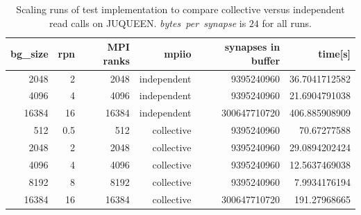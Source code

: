 \begin{table}[h!]
  \caption{Scaling runs of test implementation to compare collective versus independent read calls on JUQUEEN. \emph{bytes~per~synapse} is $24$ for all runs.}
\begin{center}
\begin{tabular}{|r|r|r|r|r|r|}
\hline
bg\_size& rpn & MPI ranks & mpiio & synapses in buffer & time[s] \\
\hline\hline
2048    &  2  & 2048      & independent  &  9395240960 & 36.7041712582\\
4096    &  4  & 4096      & independent  & 9395240960  & 21.6904791038\\
16384   &  16  & 16384      &  independent & 300647710720  & 406.885908909\\
512     &  0.5  & 512      & collective  & 9395240960  & 70.67277588\\
2048    &  2  & 2048      & collective  & 9395240960  & 29.0894202424\\
4096    &  4  & 4096      & collective  & 9395240960  & 12.5637469038\\
8192    &  8  & 8192      & collective  &  9395240960 & 7.9934176194\\
16384   &  16  & 16384      &  collective & 300647710720  & 191.27968665\\
\hline
\end{tabular}
\end{center}
\label{schumann:tbl:indevscol}
\end{table}

